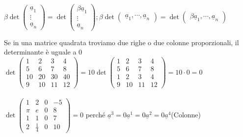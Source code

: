   \begin{proposizione}
    \phantom{}\\
    $\beta\det
    \begin{pmatrix}
      \underline{a}_1\\
      \vdots\\
      \underline{a}_n
    \end{pmatrix}=\det
    \begin{pmatrix}
      \beta\underline{a}_1\\
      \vdots\\
      \underline{a}_n
    \end{pmatrix};\beta\det
    \begin{pmatrix}
      \underline{a}_1, \cdots, \underline{a}_n
    \end{pmatrix}=\det
    \begin{pmatrix}
      \beta\underline{a}_1, \cdots, \underline{a}_n
    \end{pmatrix}$
    \begin{corollario}
      Se in una matrice quadrata troviamo due righe o due colonne
      proporzionali, il determinante è uguale a 0\\
      $
      \det
      \begin{pmatrix}
        1  & 2  & 3  & 4 \\
        5  & 6  & 7  & 8 \\
        10 & 20 & 30 & 40\\
        9  & 10 & 11 & 12
      \end{pmatrix}=10\det
      \begin{pmatrix}
        1  & 2  & 3  & 4 \\
        5  & 6  & 7  & 8 \\
        1  & 2  & 3  & 4 \\
        9  & 10 & 11 & 12
      \end{pmatrix}=10\cdot 0=0
      $\\\\
      $
      \det
      \begin{pmatrix}
        1  & 2  & 0  & -5\\
        \pi& e  & 0  & 8 \\
        1  & 1  & 0  & 7 \\
        2  & \frac{1}{4} & 0 & 10
      \end{pmatrix}=0
      $ perché
      $\underline{a}^3=0\underline{a}^{1}=0\underline{a}^{2}=0\underline{a}^{4}$(Colonne)\\\\\\

\end{corollario}
\end{proposizione}
